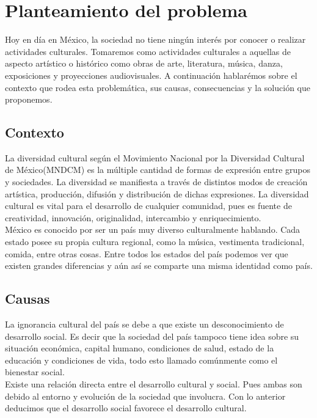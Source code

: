 \chapter{Planteamiento del problema} 

Hoy en día en México, la sociedad no tiene ningún interés por conocer o realizar actividades culturales. Tomaremos como actividades culturales a aquellas de aspecto artístico o histórico como obras de arte, literatura, música, danza, exposiciones y proyecciones audiovisuales. A continuación hablarémos sobre el contexto que rodea esta problemática, sus causas, consecuencias y la solución que proponemos.
\\[1pt]

\section{Contexto}
La diversidad cultural según el Movimiento Nacional por la Diversidad Cultural de México(MNDCM) es la múltiple cantidad de formas de expresión entre grupos y sociedades\cite{pp05}. La diversidad se manifiesta a través de distintos modos de creación artística, producción, difusión y distribución de dichas expresiones. La diversidad cultural es vital para el desarrollo de cualquier comunidad, pues es fuente de creatividad, innovación, originalidad, intercambio y enriquecimiento.
\\[1pt]

México es conocido por ser un país muy diverso culturalmente hablando. Cada estado posee su propia cultura regional, como la música, vestimenta tradicional, comida, entre otras cosas. Entre todos los estados del país podemos ver que existen grandes diferencias y aún así se comparte una misma identidad como país.
\\[1pt]

\section{Causas}

La ignorancia cultural del país se debe a que existe un desconocimiento de desarrollo social. Es decir que la sociedad del país tampoco tiene idea sobre su situación económica, capital humano, condiciones de salud, estado de la educación y condiciones de vida, todo esto llamado comúnmente como el bienestar social.
\\[1pt]

Existe una relación directa entre el desarrollo cultural y social. Pues ambas son debido al entorno y evolución de la sociedad que involucra. Con lo anterior deducimos que el desarrollo social favorece el desarrollo cultural.
\\[1pt]

